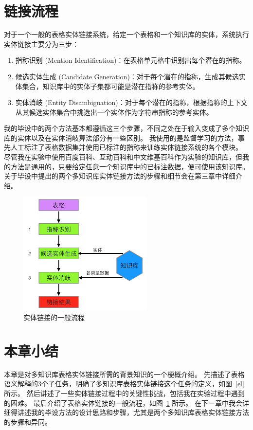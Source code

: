 \section{链接流程}

对于一个一般的表格实体链接系统，给定一个表格和一个知识库的实体，系统执行实体链接主要分为三步：

\begin{enumerate}[1.]
\item 指称识别 (Mention Identification)：在表格单元格中识别出每个潜在的指称。
\item 候选实体生成 (Candidate Generation)：对于每个潜在的指称，生成其候选实体集合，知识库中的实体子集都可能是潜在指称的参考实体。
\item 实体消岐 (Entity Disambiguation)：对于每个潜在的指称，根据指称的上下文从其候选实体集合中挑选出一个实体作为字符串指称的参考实体。
\end{enumerate}

我的毕设中的两个方法基本都遵循这三个步骤，不同之处在于输入变成了多个知识库的实体以及在实体消岐算法部分有一些区别。
我使用的是监督学习的方法，事先人工标注了表格数据集并使用已标注的指称来训练实体链接系统的各个模块。
尽管我在实验中使用百度百科、互动百科和中文维基百科作为实验的知识库，但我的方法是通用的，只要给定任意一个知识库中的已标注数据，便可使用该知识库。
关于毕设中提出的两个多知识库实体链接方法的步骤和细节会在第三章中详细介绍。

\begin{figure}[htbp]
\centering
\includegraphics[width=0.6\textwidth]{img/flow}
\caption{实体链接的一般流程}
\label{flow}
\end{figure}


\section{本章小结}
本章是对多知识库表格实体链接所需的背景知识的一个梗概介绍。
先描述了表格语义解释的3个子任务，明确了多知识库表格实体链接这个任务的定义，如图~\ref{el} 所示。
然后讲述了一些实体链接过程中的关键性挑战，包括我在实验过程中遇到的困难。
最后介绍了表格实体链接的一般流程，如图~\ref{flow} 所示。
在下一章中我会详细得讲述我的毕设方法的设计思路和步骤，尤其是两个多知识库表格实体链接方法的步骤和异同。





